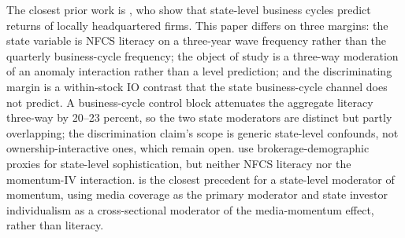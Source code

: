The closest prior work is \citet{korniotisKumar2013}, who show that state-level business cycles predict returns of locally headquartered firms. This paper differs on three margins: the state variable is NFCS literacy on a three-year wave frequency rather than the quarterly business-cycle frequency; the object of study is a three-way moderation of an anomaly interaction rather than a level prediction; and the discriminating margin is a within-stock IO contrast that the state business-cycle channel does not predict. A business-cycle control block attenuates the aggregate literacy three-way by 20--23 percent, so the two state moderators are distinct but partly overlapping; the discrimination claim's scope is generic state-level confounds, not ownership-interactive ones, which remain open. \citet{korniotisKumarPage2020} use brokerage-demographic proxies for state-level sophistication, but neither NFCS literacy nor the momentum-IV interaction. \citet{hillertJacobsMuller2014} is the closest precedent for a state-level moderator of momentum, using media coverage as the primary moderator and state investor individualism as a cross-sectional moderator of the media-momentum effect, rather than literacy.
